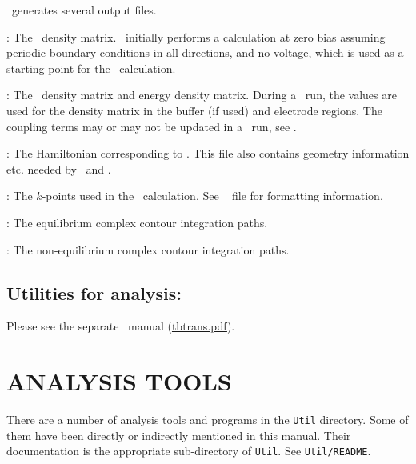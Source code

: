 \tsiesta\ generates several output files.  
\begin{description}
  \itemsep 10pt
  \parsep 0pt
  
  \item[\sysfile{DM}]: The \siesta\ density matrix. \siesta\ initially
  performs a calculation at zero bias assuming periodic boundary conditions in all
  directions, and no voltage, which is used as a starting point for the \tsiesta\
  calculation.
  
  \item[\sysfile{TSDE}]: The \tsiesta\ density matrix and energy
  density matrix. During a \tsiesta\ run, the \sysfile{DM} values are
  used for the density matrix in the buffer (if used) and electrode
  regions. The coupling terms may or may not be updated in a \tsiesta\
  run, see .
  
  \item[\sysfile{TSHS}]: The Hamiltonian corresponding to
  . This file also contains geometry information
  etc. needed by \tsiesta\ and \tbtrans.

  \item[\sysfile{TSKP}]: The $k$-points used in the \tsiesta\ calculation. See
  \siesta\  file for formatting information.

  \item[\sysfile{TSCCEQ*}]: The equilibrium complex contour integration paths.

  \item[\sysfile{TSCCNEQ*}]: The non-equilibrium complex contour
  integration paths.

\end{description} 

\subsection{Utilities for analysis:
    \texorpdfstring{\tbtrans}{TBtrans}} 
\index{tbtrans@\textbf{tbtrans}}

Please see the separate \tbtrans\ manual
(\href{run:tbtrans.pdf}{tbtrans.pdf}).


\section{ANALYSIS TOOLS}

There are a number of analysis tools and programs in the \texttt{Util}
directory. Some of them have been directly or indirectly mentioned in
this manual. Their documentation is the appropriate sub-directory of
\texttt{Util}. See \texttt{Util/README}.

